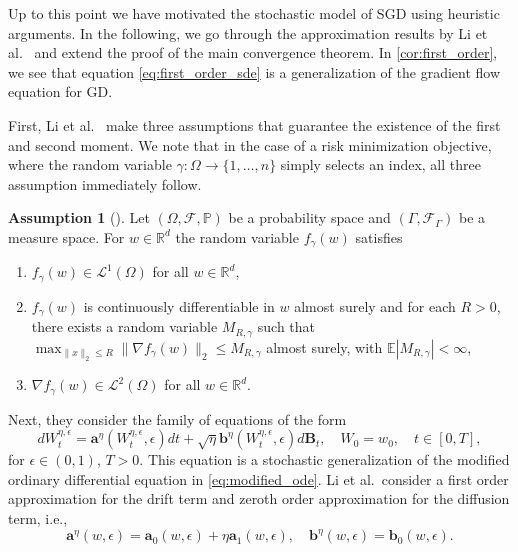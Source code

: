 \documentclass[12pt]{article}
\theoremstyle{definition}
\newtheorem{assumption}[assumption]{Assumption}
\numberwithin{equation}{section}
\newcommand{\R}{\mathbb{R}}
\newcommand{\BP}{\mathbb{P}}
\newcommand{\CF}{\mathcal{F}}
\newcommand{\norm}[1]{\lVert{#1}\rVert_2}
\begin{document}
Up to this point we have motivated the stochastic model of SGD using heuristic arguments. In the following, we go through the approximation results by Li et al.\ \cite{liStochasticModifiedEquations2019} and extend the proof of the main convergence theorem.
In \autoref{cor:first_order}, we see that equation \eqref{eq:first_order_sde} is a generalization of the gradient flow equation for GD. 

First, Li et al.\ \cite{liStochasticModifiedEquations2019} make three assumptions that guarantee the existence of the first and second moment. We note that in the case of a risk minimization objective, where the random variable $\gamma:\Omega \rightarrow \{1,\dots,n\}$ simply selects an index, all three assumption immediately follow.
\begin{assumption}[]
  \label{as:sde_model}
  Let $(\Omega, \CF, \BP)$ be a probability space and $(\Gamma, \CF_\Gamma)$ be a measure space. For $w \in \R^d$ the random variable $f_\gamma(w)$ satisfies 
  \begin{enumerate}[label=(\roman*)]
    \item $f_{\gamma}(w) \in \mathcal{L}^1(\Omega)$ for all $w \in \R^d$,
    \item \label{as:bounded_gradient} $f_{\gamma}(w)$ is continuously differentiable in $w$ almost surely and for each $R > 0$, there exists a random variable $M_{R,\gamma}$ such that $\max_{\norm{x} \leq R} \norm{ \nabla f_{\gamma}(w) } \leq M_{R,\gamma}$ almost surely, with $\mathbb{E} |M_{R,\gamma}| < \infty$,
    \item $\nabla f_{\gamma}(w) \in \mathcal{L}^2(\Omega)$ for all $w \in \R^d$.
  \end{enumerate}
\end{assumption}

Next, they consider the family of equations of the form
\begin{equation}
  \label{eq:general_sde}
  dW^{\eta, \epsilon}_t = \mathbf{a}^\eta(W^{\eta, \epsilon}_t,\epsilon)dt + \sqrt{\eta}\mathbf{b}^\eta(W^{\eta, \epsilon}_t, \epsilon)d\mathbf{B}_t, \quad W_0 = w_0, \quad t \in [0,T],
\end{equation}
for $\epsilon \in (0,1)$, $T > 0$. 
This equation is a stochastic generalization of the modified ordinary differential equation in \eqref{eq:modified_ode}. Li et al.\ consider a first order approximation for the drift term and zeroth order approximation for the diffusion term, i.e.,
\begin{equation}
  \mathbf{a}^\eta(w, \epsilon) = \mathbf{a}_0(w, \epsilon) + \eta \mathbf{a}_1(w, \epsilon), \quad \mathbf{b}^\eta(w, \epsilon) = \mathbf{b}_0(w, \epsilon).
\end{equation}
\end{document}
